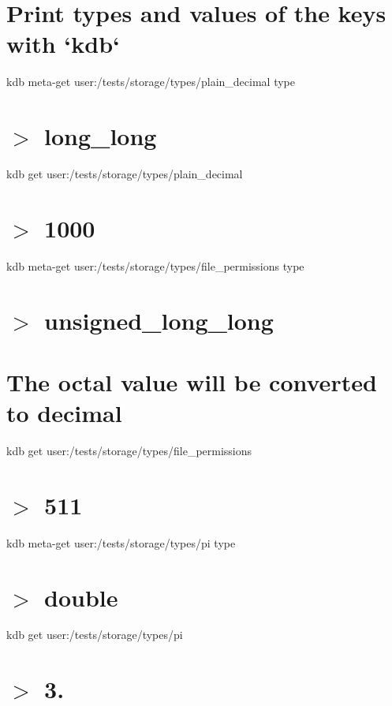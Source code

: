 \hypertarget{autotoc_md635_autotoc_md645}{}\section{Print types and values of the keys with `kdb`}\label{autotoc_md635_autotoc_md645}
kdb meta-\/get \textquotesingle{}user\+:/tests/storage/types/plain\+\_\+decimal\textquotesingle{} \textquotesingle{}type\textquotesingle{} \hypertarget{autotoc_md635_autotoc_md646}{}\section{$>$ long\+\_\+long}\label{autotoc_md635_autotoc_md646}
kdb get \textquotesingle{}user\+:/tests/storage/types/plain\+\_\+decimal\textquotesingle{} \hypertarget{autotoc_md635_autotoc_md647}{}\section{$>$ 1000}\label{autotoc_md635_autotoc_md647}
kdb meta-\/get \textquotesingle{}user\+:/tests/storage/types/file\+\_\+permissions\textquotesingle{} \textquotesingle{}type\textquotesingle{} \hypertarget{autotoc_md635_autotoc_md648}{}\section{$>$ unsigned\+\_\+long\+\_\+long}\label{autotoc_md635_autotoc_md648}
\hypertarget{autotoc_md635_autotoc_md649}{}\section{The octal value will be converted to decimal}\label{autotoc_md635_autotoc_md649}
kdb get \textquotesingle{}user\+:/tests/storage/types/file\+\_\+permissions\textquotesingle{} \hypertarget{autotoc_md635_autotoc_md650}{}\section{$>$ 511}\label{autotoc_md635_autotoc_md650}
kdb meta-\/get \textquotesingle{}user\+:/tests/storage/types/pi\textquotesingle{} \textquotesingle{}type\textquotesingle{} \hypertarget{autotoc_md635_autotoc_md651}{}\section{$>$ double}\label{autotoc_md635_autotoc_md651}
kdb get \textquotesingle{}user\+:/tests/storage/types/pi\textquotesingle{} \hypertarget{autotoc_md635_autotoc_md652}{}\section{$>$ 3.}\label{autotoc_md635_autotoc_md652}

